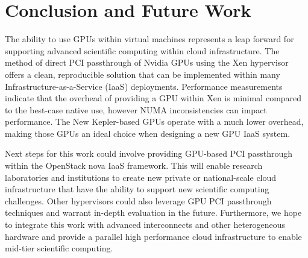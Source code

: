 \section{Conclusion and Future Work}

The ability to use GPUs within virtual machines represents a leap forward for supporting advanced scientific computing within cloud infrastructure. The method of direct PCI passthrough of Nvidia GPUs using the Xen hypervisor offers a clean, reproducible solution that can be implemented within many Infrastructure-as-a-Service (IaaS) deployments. Performance measurements indicate that the overhead of providing a GPU within Xen is minimal compared to the best-case native use, however NUMA inconsistencies can impact performance. The New Kepler-based GPUs operate with a much lower overhead, making those GPUs an ideal choice when designing a new GPU IaaS system. 

Next steps for this work could involve providing GPU-based PCI passthrough within the OpenStack nova IaaS framework. This will enable research laboratories and institutions to create new private or national-scale cloud infrastructure that have the ability to support new scientific computing challenges.  Other hypervisors could also leverage GPU PCI passthrough techniques and warrant in-depth evaluation in the future. Furthermore, we hope to integrate this work with advanced interconnects and other heterogeneous hardware and provide a parallel high performance cloud infrastructure to enable mid-tier scientific computing. 


